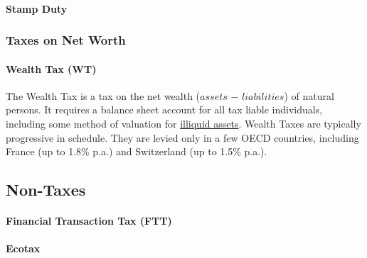 \paragraph{Stamp Duty}  \label{sec:SD}

\subsubsection{Taxes on Net Worth}

\paragraph{Wealth Tax (WT)}  \label{sec:WT} The Wealth Tax is a tax on the net wealth ($assets$ $-$ $liabilities$) of natural persons.
It requires a balance sheet account for all tax liable individuals, including some method of valuation for \hyperref[des:NoIlliquidAssets]{illiquid assets}.
Wealth Taxes are typically progressive in schedule.
They are levied only in a few OECD countries, including France (up to 1.8\% p.a.) and Switzerland (up to 1.5\% p.a.).



\subsection{Non-Taxes}

\paragraph{Financial Transaction Tax (FTT)}  \label{sec:FTT}

\paragraph{Ecotax}  \label{sec:Ecotax}


